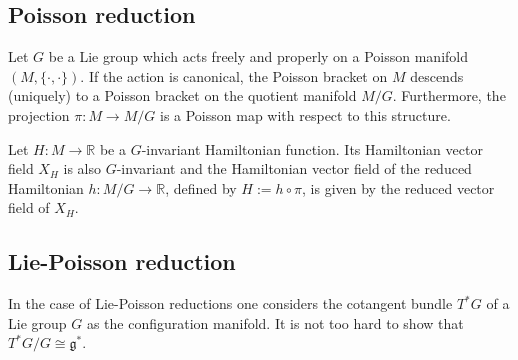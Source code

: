 \subsection{Poisson reduction}


    \begin{theorem}
        Let $G$ be a Lie group which acts freely and properly on a Poisson manifold $(M, \{\cdot, \cdot\})$. If the action is canonical, the Poisson bracket on $M$ descends (uniquely) to a Poisson bracket on the quotient manifold $M/G$. Furthermore, the projection $\pi:M\rightarrow M/G$ is a Poisson map with respect to this structure.
    \end{theorem}
    \begin{property}
        Let $H:M\rightarrow\mathbb{R}$ be a $G$-invariant Hamiltonian function. Its Hamiltonian vector field $X_H$ is also $G$-invariant and the Hamiltonian vector field of the reduced Hamiltonian $h:M/G\rightarrow\mathbb{R}$, defined by $H:=h\circ\pi$, is given by the reduced vector field of $X_H$.
    \end{property}

\subsection{Lie-Poisson reduction}

    In the case of Lie-Poisson reductions one considers the cotangent bundle $T^*G$ of a Lie group $G$ as the configuration manifold. It is not too hard to show that $T^*G/G\cong\mathfrak{g}^*$.

